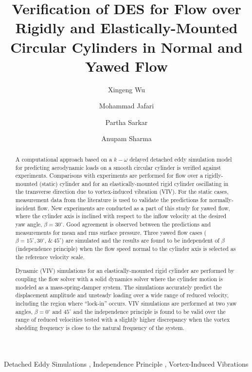 \documentclass[12pt,authoryear]{elsarticle}
\begin{document}
\begin{frontmatter}

\title{Verification of DES for Flow over Rigidly and Elastically-Mounted
Circular Cylinders in Normal and Yawed Flow}


\author[1]{Xingeng Wu}
\author[1]{Mohammad Jafari} 
\author[2]{Partha Sarkar}
\author[3]{Anupam Sharma}
\address{Department of Aerospace Engineering, Iowa State University, Ames, Iowa, 50011}

\begin{abstract}
A computational approach based on a $k-\omega$ delayed detached eddy simulation
model for predicting aerodynamic loads on a smooth circular cylinder is
verified against experiments. Comparisons with experiments are performed for
flow over a rigidly-mounted (static) cylinder and for an elastically-mounted
rigid cylinder oscillating in the transverse direction due to vortex-induced
vibration (VIV). For the static cases, measurement data from the literature is
used to validate the predictions for normally-incident flow.  New experiments
are conducted as a part of this study for yawed flow, where the cylinder axis
is inclined with respect to the inflow velocity at the desired yaw angle,
$\beta=30^\circ$. Good agreement is observed between the predictions and
measurements for mean and rms surface pressure.  Three yawed flow cases
($\beta=15^\circ, 30^\circ, \,\&\, 45^\circ$) are simulated and the results are
found to be independent of $\beta$ (independence principle) when the flow speed
normal to the cylinder axis is selected as the reference velocity scale.

Dynamic (VIV) simulations for an elastically-mounted rigid cylinder are
performed by coupling the flow solver with a solid dynamics solver where the
cylinder motion is modeled as a mass-spring-damper system. The simulations
accurately predict the displacement amplitude and unsteady loading over a wide
range of reduced velocity, including the region where ``lock-in'' occurs. VIV
simulations are performed at two yaw angles, $\beta=0^\circ$ and $45^\circ$ and
the independence principle is found to be valid over the range of reduced
velocities tested with a slightly higher discrepancy when the vortex shedding
frequency is close to the natural frequency of the system.
\end{abstract}

\begin{keyword}
  Detached Eddy Simulations \sep 
  Independence Principle \sep
  Vortex-Induced Vibrations
\end{keyword}
\end{frontmatter}
\end{document}
